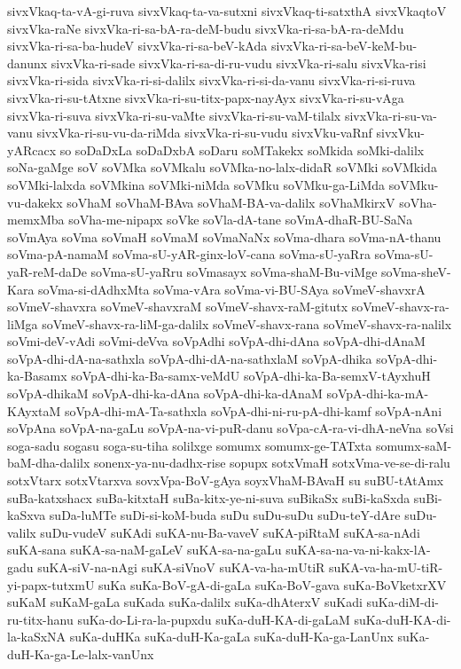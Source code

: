 {sivxVkaq-ta-vA-gi-ruva
sivxVkaq-ta-va-sutxni
sivxVkaq-ti-satxthA
sivxVkaqtoV
sivxVka-raNe
sivxVka-ri-sa-bA-ra-deM-budu
sivxVka-ri-sa-bA-ra-deMdu
sivxVka-ri-sa-ba-hudeV
sivxVka-ri-sa-beV-kAda
sivxVka-ri-sa-beV-keM-bu-danunx
sivxVka-ri-sade
sivxVka-ri-sa-di-ru-vudu
sivxVka-ri-salu
sivxVka-risi
sivxVka-ri-sida
sivxVka-ri-si-dalilx
sivxVka-ri-si-da-vanu
sivxVka-ri-si-ruva
sivxVka-ri-su-tAtxne
sivxVka-ri-su-titx-papx-nayAyx
sivxVka-ri-su-vAga
sivxVka-ri-suva
sivxVka-ri-su-vaMte
sivxVka-ri-su-vaM-tilalx
sivxVka-ri-su-va-vanu
sivxVka-ri-su-vu-da-riMda
sivxVka-ri-su-vudu
sivxVku-vaRnf
sivxVku-yARcacx
so
soDaDxLa
soDaDxbA
soDaru
soMTakekx
soMkida
soMki-dalilx
soNa-gaMge
soV
soVMka
soVMkalu
soVMka-no-lalx-didaR
soVMki
soVMkida
soVMki-lalxda
soVMkina
soVMki-niMda
soVMku
soVMku-ga-LiMda
soVMku-vu-dakekx
soVhaM
soVhaM-BAva
soVhaM-BA-va-dalilx
soVhaMkirxV
soVha-memxMba
soVha-me-nipapx
soVke
soVla-dA-tane
soVmA-dhaR-BU-SaNa
soVmAya
soVma
soVmaH
soVmaM
soVmaNaNx
soVma-dhara
soVma-nA-thanu
soVma-pA-namaM
soVma-sU-yAR-ginx-loV-cana
soVma-sU-yaRra
soVma-sU-yaR-reM-daDe
soVma-sU-yaRru
soVmasayx
soVma-shaM-Bu-viMge
soVma-sheV-Kara
soVma-si-dAdhxMta
soVma-vAra
soVma-vi-BU-SAya
soVmeV-shavxrA
soVmeV-shavxra
soVmeV-shavxraM
soVmeV-shavx-raM-gitutx
soVmeV-shavx-ra-liMga
soVmeV-shavx-ra-liM-ga-dalilx
soVmeV-shavx-rana
soVmeV-shavx-ra-nalilx
soVmi-deV-vAdi
soVmi-deVva
soVpAdhi
soVpA-dhi-dAna
soVpA-dhi-dAnaM
soVpA-dhi-dA-na-sathxla
soVpA-dhi-dA-na-sathxlaM
soVpA-dhika
soVpA-dhi-ka-Basamx
soVpA-dhi-ka-Ba-samx-veMdU
soVpA-dhi-ka-Ba-semxV-tAyxhuH
soVpA-dhikaM
soVpA-dhi-ka-dAna
soVpA-dhi-ka-dAnaM
soVpA-dhi-ka-mA-KAyxtaM
soVpA-dhi-mA-Ta-sathxla
soVpA-dhi-ni-ru-pA-dhi-kamf
soVpA-nAni
soVpAna
soVpA-na-gaLu
soVpA-na-vi-puR-danu
soVpa-cA-ra-vi-dhA-neVna
soVsi
soga-sadu
sogasu
soga-su-tiha
solilxge
somumx
somumx-ge-TATxta
somumx-saM-baM-dha-dalilx
sonenx-ya-nu-dadhx-rise
sopupx
sotxVmaH
sotxVma-ve-se-di-ralu
sotxVtarx
sotxVtarxva
sovxVpa-BoV-gAya
soyxVhaM-BAvaH
su
suBU-tAtAmx
suBa-katxshacx
suBa-kitxtaH
suBa-kitx-ye-ni-suva
suBikaSx
suBi-kaSxda
suBi-kaSxva
suDa-luMTe
suDi-si-koM-buda
suDu
suDu-suDu
suDu-teY-dAre
suDu-valilx
suDu-vudeV
suKAdi
suKA-nu-Ba-vaveV
suKA-piRtaM
suKA-sa-nAdi
suKA-sana
suKA-sa-naM-gaLeV
suKA-sa-na-gaLu
suKA-sa-na-va-ni-kakx-lA-gadu
suKA-siV-na-nAgi
suKA-siVnoV
suKA-va-ha-mUtiR
suKA-va-ha-mU-tiR-yi-papx-tutxmU
suKa
suKa-BoV-gA-di-gaLa
suKa-BoV-gava
suKa-BoVketxrXV
suKaM
suKaM-gaLa
suKada
suKa-dalilx
suKa-dhAterxV
suKadi
suKa-diM-di-ru-titx-hanu
suKa-do-Li-ra-la-pupxdu
suKa-duH-KA-di-gaLaM
suKa-duH-KA-di-la-kaSxNA
suKa-duHKa
suKa-duH-Ka-gaLa
suKa-duH-Ka-ga-LanUnx
suKa-duH-Ka-ga-Le-lalx-vanUnx
}
